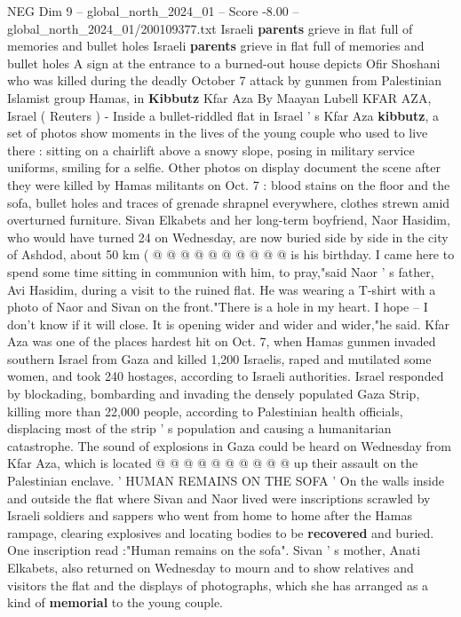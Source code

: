 \begin{textsample}{NEG Dim 9 – global\_north\_2024\_01 – Score -8.00 – global\_north\_2024\_01/200109377.txt}  \label{ex:f9_neg_195}
Israeli \textbf{parents} grieve in flat full of memories and bullet holes Israeli \textbf{parents} grieve in flat full of memories and bullet holes A sign at the entrance to a burned-out house depicts Ofir Shoshani who was killed during the deadly October 7 attack by gunmen from Palestinian Islamist group Hamas, in \textbf{Kibbutz} Kfar Aza By Maayan Lubell KFAR AZA, Israel ( Reuters ) - Inside a bullet-riddled flat in Israel ' s Kfar Aza \textbf{kibbutz}, a set of photos show moments in the lives of the young couple who used to live there : sitting on a chairlift above a snowy slope, posing in military service uniforms, smiling for a selfie.
Other photos on display document the scene after they were killed by Hamas militants on Oct. 7 : blood stains on the floor and the sofa, bullet holes and traces of grenade shrapnel everywhere, clothes strewn amid overturned furniture.
Sivan Elkabets and her long-term boyfriend, Naor Hasidim, who would have turned 24 on Wednesday, are now buried side by side in the city of Ashdod, about 50 km ( @ @ @ @ @ @ @ @ @ @ is his birthday.
I came here to spend some time sitting in communion with him, to pray,"said Naor ' s father, Avi Hasidim, during a visit to the ruined flat.
He was wearing a T-shirt with a photo of Naor and Sivan on the front."There is a hole in my heart.
I hope -- I don't know if it will close.
It is opening wider and wider and wider,"he said.
Kfar Aza was one of the places hardest hit on Oct. 7, when Hamas gunmen invaded southern Israel from Gaza and killed 1,200 Israelis, raped and mutilated some women, and took 240 hostages, according to Israeli authorities.
Israel responded by blockading, bombarding and invading the densely populated Gaza Strip, killing more than 22,000 people, according to Palestinian health officials, displacing most of the strip ' s population and causing a humanitarian catastrophe.
The sound of explosions in Gaza could be heard on Wednesday from Kfar Aza, which is located @ @ @ @ @ @ @ @ @ @ up their assault on the Palestinian enclave. ' HUMAN REMAINS ON THE SOFA ' On the walls inside and outside the flat where Sivan and Naor lived were inscriptions scrawled by Israeli soldiers and sappers who went from home to home after the Hamas rampage, clearing explosives and locating bodies to be \textbf{recovered} and buried.
One inscription read :"Human remains on the sofa".
Sivan ' s mother, Anati Elkabets, also returned on Wednesday to mourn and to show relatives and visitors the flat and the displays of photographs, which she has arranged as a kind of \textbf{memorial} to the young couple.

\end{textsample}
